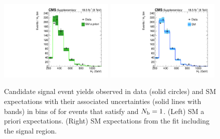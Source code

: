 \begin{figure}[h!]
  \begin{center}
    \includegraphics[width=0.49\textwidth,page=2]{figures/fit_result/bestFit_2012dev_RQcdZero_fZinvAll_1b_ge4j-12p_smOnly} 
    \includegraphics[width=0.49\textwidth,page=2]{figures/fit_result/bestFit_2012dev_RQcdZero_fZinvAll_1b_ge4j-12hp_smOnly} \\
    \caption{\label{fig:best-fit-0b} Candidate signal event yields
      observed in data (solid circles) and SM expectations with their
      associated uncertainties (solid lines with bands) in bins of
      \scalht for events that satisfy \njethigh and $N_{\text{b}} = 1$. (Left)
      SM a priori expectations. (Right) SM expectations from the fit
      including the signal region. }
  \end{center}
\end{figure}

